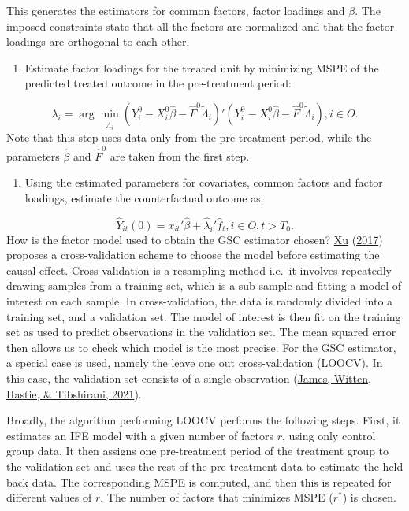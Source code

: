 \documentclass[12pt,nobind, a4paper]{reedthesis}
\providecommand{\tightlist}{%
	\setlength{\itemsep}{0pt}\setlength{\parskip}{0pt}}
\begin{document}
 This generates the estimators for common factors, factor loadings and \(\beta\). The imposed constraints state that all the factors are normalized and that the factor loadings are orthogonal to each other.
 \begin{enumerate}
 \def\labelenumi{\arabic{enumi}.}
 \setcounter{enumi}{1}
 \tightlist
 \item
   Estimate factor loadings for the treated unit by minimizing MSPE of the predicted treated outcome in the pre-treatment period:
 \end{enumerate}
 \[\lambda_{i}=\arg\min_{\tilde{\Lambda}_{i}} (Y_{i}^{0}-X_{i}^{0} \hat{\beta}-\hat{F}^{0}\tilde{\Lambda}_{i})'(Y_{i}^{0}-X_{i}^{0} \hat{\beta}-\hat{F}^{0}\tilde{\Lambda}_{i}), i \in O.\]
 Note that this step uses data only from the pre-treatment period, while the parameters \(\hat{\beta}\) and \(\hat{F}^{0}\) are taken from the first step.
 \begin{enumerate}
 \def\labelenumi{\arabic{enumi}.}
 \setcounter{enumi}{2}
 \tightlist
 \item
   Using the estimated parameters for covariates, common factors and factor loadings, estimate the counterfactual outcome as:
 \end{enumerate}
 \[\hat{Y}_{it}(0)=x_{it}'\hat{\beta}+\hat{\lambda}_{i}'\hat{f}_{t},  i\in O, t>T_{0}.\]
 How is the factor model used to obtain the GSC estimator chosen? \protect\hyperlink{ref-xu_generalized_2017}{Xu} (\protect\hyperlink{ref-xu_generalized_2017}{2017}) proposes a cross-validation scheme to choose the model before estimating the causal effect. Cross-validation is a resampling method i.e.~it involves repeatedly drawing samples from a training set, which is a sub-sample and fitting a model of interest on each sample. In cross-validation, the data is randomly divided into a training set, and a validation set. The model of interest is then fit on the training set as used to predict observations in the validation set. The mean squared error then allows us to check which model is the most precise. For the GSC estimator, a special case is used, namely the leave one out cross-validation (LOOCV). In this case, the validation set consists of a single observation (\protect\hyperlink{ref-james_introduction_2021}{James, Witten, Hastie, \& Tibshirani, 2021}).
 \linebreak

 Broadly, the algorithm performing LOOCV performs the following steps. First, it estimates an IFE model with a given number of factors \(r\), using only control group data. It then assigns one pre-treatment period of the treatment group to the validation set and uses the rest of the pre-treatment data to estimate the held back data. The corresponding MSPE is computed, and then this is repeated for different values of \(r\). The number of factors that minimizes MSPE (\(r^{*}\)) is chosen.
 \linebreak
\end{document}
